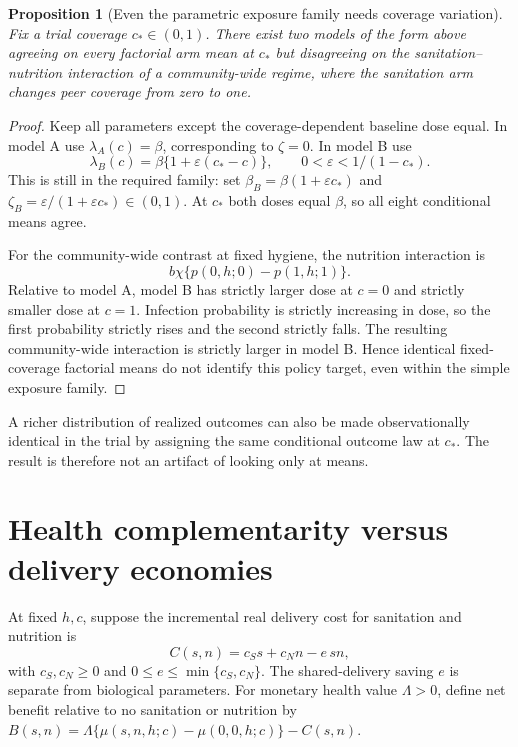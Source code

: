 \documentclass[11pt,a4paper]{article}
\newtheorem{proposition}[theorem]{Proposition}
\theoremstyle{definition}
\theoremstyle{remark}
\begin{document}
\begin{proposition}[Even the parametric exposure family needs coverage variation]\label{pr:transport}
Fix a trial coverage $c_*\in(0,1)$. There exist two models of the form above agreeing on every factorial arm mean at $c_*$ but disagreeing on the sanitation--nutrition interaction of a community-wide regime, where the sanitation arm changes peer coverage from zero to one.
\end{proposition}
\begin{proof}
Keep all parameters except the coverage-dependent baseline dose equal. In model A use $\lambda_A(c)=\beta$, corresponding to $\zeta=0$. In model B use
\[
 \lambda_B(c)=\beta\{1+\varepsilon(c_*-c)\},
 \qquad 0<\varepsilon<1/(1-c_*).
\]
This is still in the required family: set $\beta_B=\beta(1+\varepsilon c_*)$ and
$\zeta_B=\varepsilon/(1+\varepsilon c_*)\in(0,1)$. At $c_*$ both doses equal $\beta$, so all eight conditional means agree.

For the community-wide contrast at fixed hygiene, the nutrition interaction is
\[
 b\chi\{p(0,h;0)-p(1,h;1)\}.
\]
Relative to model A, model B has strictly larger dose at $c=0$ and strictly smaller dose at $c=1$. Infection probability is strictly increasing in dose, so the first probability strictly rises and the second strictly falls. The resulting community-wide interaction is strictly larger in model B. Hence identical fixed-coverage factorial means do not identify this policy target, even within the simple exposure family.
\end{proof}

A richer distribution of realized outcomes can also be made observationally identical in the trial by assigning the same conditional outcome law at $c_*$. The result is therefore not an artifact of looking only at means.

\section{Health complementarity versus delivery economies}
At fixed $h,c$, suppose the incremental real delivery cost for sanitation and nutrition is
\[
 C(s,n)=c_Ss+c_Nn-e\,sn,
\]
with $c_S,c_N\geq0$ and $0\leq e\leq\min\{c_S,c_N\}$. The shared-delivery saving $e$ is separate from biological parameters. For monetary health value $\Lambda>0$, define net benefit relative to no sanitation or nutrition by
$B(s,n)=\Lambda\{\mu(s,n,h;c)-\mu(0,0,h;c)\}-C(s,n)$.
\end{document}
